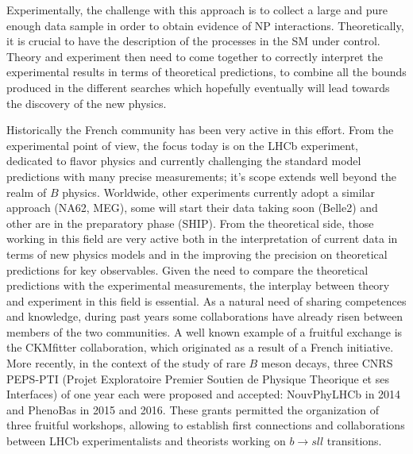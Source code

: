 Experimentally, the challenge with this approach is to collect a large and pure enough data sample in order to obtain evidence of NP interactions. Theoretically, it is crucial to have the description of the processes in the SM under control. Theory and experiment then need to come together to correctly interpret the experimental results in terms of theoretical predictions, to combine all the bounds produced in the different searches which hopefully eventually will lead towards the discovery of the new physics. 

Historically the French community has been very active in this effort. From the experimental point of view, the focus today is on the  LHCb experiment, dedicated to flavor physics and currently challenging the standard model predictions with many precise measurements; it's scope extends well beyond the realm of $B$ physics. Worldwide, other experiments currently adopt a similar approach (NA62, MEG), some will start their data taking soon (Belle2) and other are in the preparatory phase (SHIP). From the theoretical side, those working in this field are very active both in the interpretation of current data in terms of new physics models and in the improving the precision on theoretical  predictions for key observables.  Given the need to compare the theoretical predictions with the experimental measurements, the interplay between theory and experiment in this field is essential. As a natural need of sharing competences and knowledge, during past years some collaborations have already risen between members of the two communities. A well known example of a fruitful exchange is the CKMfitter collaboration, which originated as a result of a French initiative. More recently, in the context of the study of rare $B$ meson decays, three  CNRS PEPS-PTI (Projet Exploratoire Premier Soutien de Physique Theorique et ses Interfaces) of one year each were proposed and accepted:  NouvPhyLHCb in 2014 and PhenoBas in 2015 and 2016. These grants permitted the organization of three fruitful workshops,  allowing to establish first connections and collaborations between LHCb experimentalists and theorists  working on $b \to sll$ transitions. 

